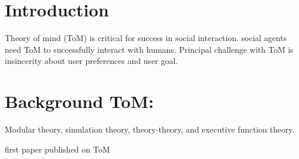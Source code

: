 \documentclass{llncs}
\begin{document}
\title{\vskip -10pt}

\author{Lydia Ould Ouali, Charles Rich \and
Nicolas Sabouret }

\maketitle 
\begin{abstract}\vskip -20pt
  
\end{abstract}

\section{Introduction}
Theory of mind (ToM) is critical for success in social interaction. 
social agents need ToM to successfully interact with humans.
Principal challenge with ToM is insincerity  about user preferences and user goal.

\section{Background ToM:}
Modular theory, 
simulation theory, 
theory-theory, 
and executive function theory.

first paper published on ToM 

\vskip 4pt


\end{document}
